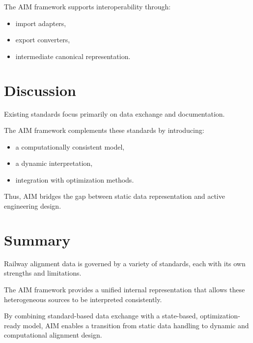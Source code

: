 The AIM framework supports interoperability through:
\begin{itemize}
\item import adapters,
\item export converters,
\item intermediate canonical representation.
\end{itemize}


\section{Discussion}

Existing standards focus primarily on data exchange and documentation.

The AIM framework complements these standards by introducing:
\begin{itemize}
\item a computationally consistent model,
\item a dynamic interpretation,
\item integration with optimization methods.
\end{itemize}

Thus, AIM bridges the gap between static data representation and active
engineering design.


\section{Summary}

\begin{summary}
Railway alignment data is governed by a variety of standards, each with
its own strengths and limitations.

The AIM framework provides a unified internal representation that allows
these heterogeneous sources to be interpreted consistently.

By combining standard-based data exchange with a state-based,
optimization-ready model, AIM enables a transition from static data
handling to dynamic and computational alignment design.
\end{summary}

